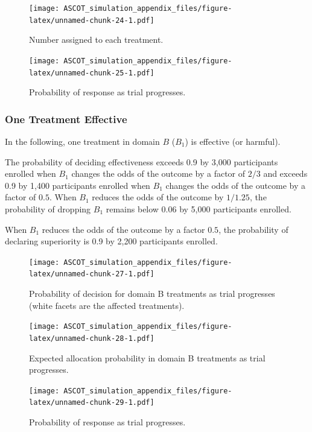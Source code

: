 \documentclass[
]{article}
\begin{document}
\begin{figure}
\centering
\texttt{[image: ASCOT\_simulation\_appendix\_files/figure-latex/unnamed-chunk-24-1.pdf]}
\caption{\label{fig:unnamed-chunk-24}Number assigned to each treatment.}
\end{figure}

\begin{figure}
\centering
\texttt{[image: ASCOT\_simulation\_appendix\_files/figure-latex/unnamed-chunk-25-1.pdf]}
\caption{\label{fig:unnamed-chunk-25}Probability of response as trial progresses.}
\end{figure}

\clearpage

\hypertarget{one-treatment-effective-1}{%
\subsubsection{One Treatment Effective}\label{one-treatment-effective-1}}

In the following, one treatment in domain \(B\) (\(B_1\)) is effective (or harmful).

The probability of deciding effectiveness exceeds 0.9 by 3,000 participants enrolled when \(B_1\) changes the odds of the outcome by a factor of \(2/3\) and exceeds 0.9 by 1,400 participants enrolled when \(B_1\) changes the odds of the outcome by a factor of \(0.5\).
When \(B_1\) reduces the odds of the outcome by \(1/1.25\), the probability of dropping \(B_1\) remains below 0.06 by 5,000 participants enrolled.

When \(B_1\) reduces the odds of the outcome by a factor \(0.5\), the probability of declaring superiority is 0.9 by 2,200 participants enrolled.

\begin{figure}
\centering
\texttt{[image: ASCOT\_simulation\_appendix\_files/figure-latex/unnamed-chunk-27-1.pdf]}
\caption{\label{fig:unnamed-chunk-27}Probability of decision for domain B treatments as trial progresses (white facets are the affected treatments).}
\end{figure}

\begin{figure}
\centering
\texttt{[image: ASCOT\_simulation\_appendix\_files/figure-latex/unnamed-chunk-28-1.pdf]}
\caption{\label{fig:unnamed-chunk-28}Expected allocation probability in domain B treatments as trial progresses.}
\end{figure}

\begin{figure}
\centering
\texttt{[image: ASCOT\_simulation\_appendix\_files/figure-latex/unnamed-chunk-29-1.pdf]}
\caption{\label{fig:unnamed-chunk-29}Probability of response as trial progresses.}
\end{figure}
\end{document}
